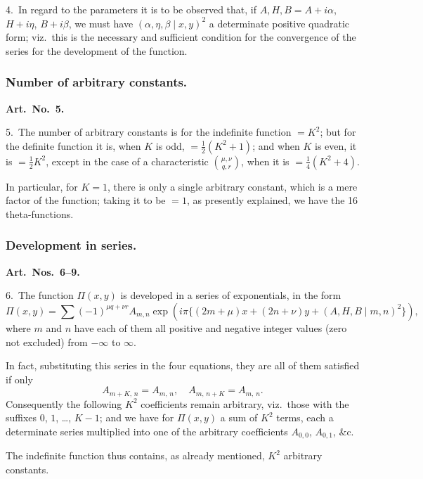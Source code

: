 \documentclass[11pt,a4paper]{book}
\begin{document}
\medskip

4.\ In regard to the parameters it is to be observed that, if $A, H, B = A + i\alpha$, $H + i\eta$, $B + i\beta$, we must have $(\alpha, \eta, \beta \mid x, y)^2$ a determinate positive quadratic form; viz.\ this is the necessary and sufficient condition for the convergence of the series for the development of the function.

\subsubsection*{Number of arbitrary constants.}

\textbf{Art.~No.~5.}

5.\ The number of arbitrary constants is for the indefinite function $= K^2$; but for the definite function it is, when $K$ is odd, $= \frac{1}{2}(K^2 + 1)$; and when $K$ is even, it is $= \frac{1}{2}K^2$, except in the case of a characteristic $\binom{\mu, \nu}{q, r}$, when it is $= \frac{1}{4}(K^2 + 4)$.

In particular, for $K = 1$, there is only a single arbitrary constant, which is a mere factor of the function; taking it to be $= 1$, as presently explained, we have the 16 theta-functions.

\subsubsection*{Development in series.}

\textbf{Art.~Nos.~6--9.}

6.\ The function $\Pi(x, y)$ is developed in a series of exponentials, in the form
\[
\Pi(x, y) = \sum (-1)^{\mu q + \nu r}A_{m,n}\exp(i\pi\{(2m + \mu)x + (2n + \nu)y + (A, H, B \mid m, n)^2\}),
\]
where $m$ and $n$ have each of them all positive and negative integer values (zero not excluded) from $-\infty$ to $\infty$.

In fact, substituting this series in the four equations, they are all of them satisfied if only
\[
A_{m+K,\,n} = A_{m,\,n}, \quad A_{m,\,n+K} = A_{m,\,n}.
\]
Consequently the following $K^2$ coefficients remain arbitrary, viz.\ those with the suffixes $0$, $1$, \ldots, $K-1$; and we have for $\Pi(x, y)$ a sum of $K^2$ terms, each a determinate series multiplied into one of the arbitrary coefficients $A_{0,0}$, $A_{0,1}$, \&c.

The indefinite function thus contains, as already mentioned, $K^2$ arbitrary constants.

\medskip
\end{document}
